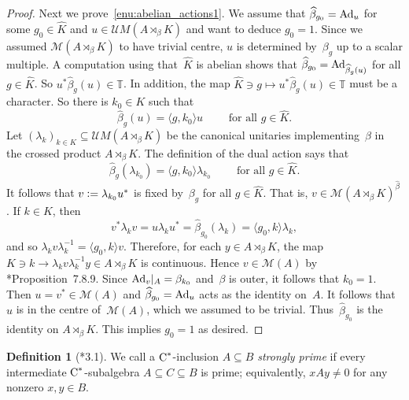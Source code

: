 \documentclass[a4paper]{amsart}
\theoremstyle{plain}
\theoremstyle{definition}
\newtheorem{definition}[theorem]{Definition}
\theoremstyle{remark}
\numberwithin{theorem}{section}
\numberwithin{equation}{section}
\newcommand*{\nb}{\nobreakdash}
\newcommand*{\T}{\mathbb T}%
\newcommand*{\Cst}{\textup C^*}%
\newcommand*{\Mult}{\mathcal M}%
\newcommand*{\UMult}{\mathcal UM}%
\newcommand*{\Ad}{\textup{Ad}}%
\newcommand*{\defeq}{\mathrel{\vcentcolon=}}%
\begin{document}
\begin{proof}
  Next we prove~\ref{enu:abelian_actions1}.
  We assume that \(\widehat{\beta}_{g_0}=\Ad_u\) for some \(g_0\in
  \widehat{K}\) and \(u \in \UMult(A\rtimes_\beta K)\) and want to
  deduce \(g_0=1\).
  Since we assumed \(\Mult(A\rtimes_\beta K)\) to have trivial centre,
  \(u\) is determined by~\(\beta_g\) up to a scalar multiple.
  A computation using that~\(\widehat{K}\) is abelian shows that
  \(\widehat{\beta}_{g_0}=\Ad_{\widehat{\beta}_g(u)}\)
  for all \(g\in \widehat{K}\).
  So \(u^*\widehat{\beta}_g(u)\in \T\).
  In addition, the map \(\widehat{K}\ni g\mapsto
  u^*\widehat{\beta}_g(u)\in \T\) must be a character.
  So there is \(k_0\in K\) such that
  \[
    \widehat{\beta}_g(u) = \langle g, k_0\rangle u \qquad \text{ for all }g\in \widehat{K}.
  \]
  Let \((\lambda_k)_{k\in K}\subseteq \UMult(A\rtimes_\beta K)\) be
  the canonical unitaries implementing~\(\beta\) in the crossed
  product \(A\rtimes_\beta K\).
  The definition of the dual action says that
  \[
    \widehat{\beta}_g(\lambda_{k_0})
    = \langle g, k_0\rangle \lambda_{k_0} \qquad \text{ for all }g\in \widehat{K}.
  \]
  It follows that \(v\defeq \lambda_{k_0} u^*\) is fixed
  by~\(\beta_g\) for all \(g\in \widehat{K}\).
  That is, \(v\in \Mult(A\rtimes_\beta K)^{\widehat{\beta}}\).
  If \(k \in K\), then
  \[
    v^*\lambda_k v
    = u \lambda_k u^*
    = \widehat{\beta}_{g_0}(\lambda_k)
    = \langle g_0, k\rangle \lambda_k,
  \]
  and so \(\lambda_k v \lambda_k^{-1} = \langle g_0, k\rangle v\).
  Therefore, for each \(y\in  A\rtimes_\beta K\), the map \(K\ni k\to
  \lambda_k v \lambda_k^{-1}y\in A\rtimes_\beta K\) is continuous.
  Hence \(v\in \Mult(A)\) by
  \cite{Pedersen:Cstar_automorphisms_vol2}*{Proposition~7.8.9}.
  Since \(\Ad_v|_A=\beta_{k_0}\) and~\(\beta\) is outer, it follows
  that \(k_0=1\).
  Then \(u=v^*\in \Mult(A)\) and \(\widehat{\beta}_{g_0}=\Ad_u\) acts
  as the identity on~\(A\).
  It follows that~\(u\) is in the centre of~\(\Mult(A)\), which we
  assumed to be trivial.
  Thus~\(\widehat{\beta}_{g_0}\) is the identity on \(A\rtimes_\beta
  K\).
  This implies \(g_0=1\) as desired.
\end{proof}

\begin{definition}[\cite{Bratteli-Elliott-Kishimoto:Quasi-product}*{3.1}]
  We call a \(\Cst\)\nb-inclusion \(A\subseteq B\) \emph{strongly
    prime} if every intermediate \(\Cst\)\nb-subalgebra \(A\subseteq
  C\subseteq B\) is prime; equivalently, \(x A y \neq 0\) for any
  nonzero \(x,y\in B\).
\end{definition}
\end{document}
